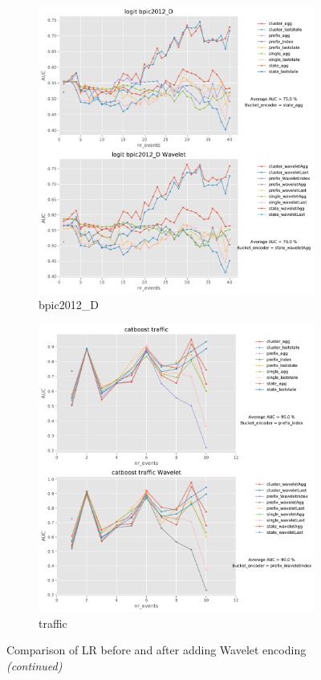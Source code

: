 \documentclass[twoside,11pt]{Latex/Classes/PhDthesisPSnPDF}
\begin{document}
\begin{figure}[!htbp]
	\medskip
	\begin{subfigure}{0.48\textwidth}
		\includegraphics[width=\linewidth]{images/wavelet/graphs2logit/bpic2012_D.pdf}	
		\caption{bpic2012\_D} 
	\end{subfigure}\hspace*{\fill}
	\begin{subfigure}{0.48\textwidth}
		\includegraphics[width=\linewidth]{images/wavelet/graphs2cat/traffic.pdf}
		\caption{traffic}
	\end{subfigure}
	\caption{Comparison of LR before and after adding Wavelet encoding \textit{(continued)}}
	\label{fig:wl2}
\end{figure}
\end{document}
